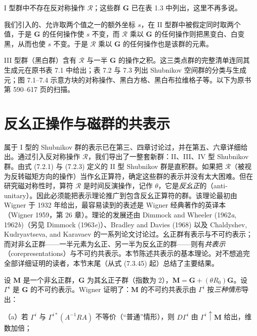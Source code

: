 I 型群中不存在反对称操作 $\mathcal{R}$；这些群 $\mathbf{G}$ 已在表 1.3 中列出，这里不再多说。

我们引入的、允许取两个值之一的额外坐标 $s$，在 II 型群中被假定同时取两个值，于是 $\mathbf{G}$ 的任何操作使 $s$ 不变，而 $\mathcal{R}$ 乘以 $\mathbf{G}$ 的任何操作则把黑变白、白变黑，从而也使 $s$ 不变。于是 $\mathcal{R}$ 乘以 $\mathbf{G}$ 的任何操作也是该群的元素。

III 型群（黑白群）含有 $\mathcal{R}$ 与一半 $\mathbf{G}$ 的操作之积。这三类点群的完整清单连同其生成元在原书表 7.1 中给出；表 7.2 与 7.3 列出 Shubnikov 空间群的分类与生成元；图 7.1--7.4 示意方块的对称操作、黑白方格、黑白布拉维格子等。以下为原书第 590--617 页的扫描。



\section{反幺正操作与磁群的共表示}

属于 I 型的 Shubnikov 群的表示已在第三、四章讨论过，并在第五、六章详细给出。通过引入反对称操作 $\mathcal{R}$，我们导出了一整套新群：II、III、IV 型 Shubnikov 群。由式 (7.2.1) 与 (7.2.3) 定义的 II 型 Shubnikov 群是直积群。如果把 $\mathcal{R}$（被视为反转磁矩方向的操作）当作幺正算符，确定这些群的表示并没有太大困难。但在研究磁对称性时，算符 $\mathcal{R}$ 是时间反演操作，记作 $\theta$，它是\textit{反幺正}的（anti-unitary）。因此必须能把表示理论推广到包含反幺正算符的群。该理论最初由 Wigner 于 1932 年给出，最容易读到的表述是 Wigner 经典著作的英译本（Wigner 1959，第 26 章）。理论的发展还由 Dimmock and Wheeler (1962\textit{a}, 1962\textit{b})（另见 Dimmock (1963\textit{e})）、Bradley and Davies (1968) 以及 Chaldyshev, Kudryavtseva, and Karavaev 的一系列论文讨论过。幺正群有表示与不可约表示；而对非幺正群——一半元素为幺正、另一半为反幺正的群——则有\textit{共表示}（corepresentations）与不可约共表示。本节陈述共表示的基本理论。对不想追完全部详细证明的读者，本节末尾（从式 (7.3.45) 起）总结了主要结果。

设 $\mathbf{M}$ 是一个非幺正群，$\mathbf{G}$ 为其幺正子群（指数为 2），$\mathbf{M} = \mathbf{G} + (\theta R_{0})\mathbf{G}$。设 $\Gamma^{i}$ 是 $\mathbf{G}$ 的不可约表示。Wigner 证明了：$\mathbf{M}$ 的不可约共表示由 $\Gamma^{i}$ 按\textit{三种情形}导出：

\noindent（a）若 $\Gamma^{i}$ 与 $\Gamma^{i*}(A^{-1}RA)$ 不等价（“普通”情形），则 $D\Gamma^{i}$ 由 $\Gamma^{i} \uparrow \mathbf{M}$ 给出，维数加倍；

